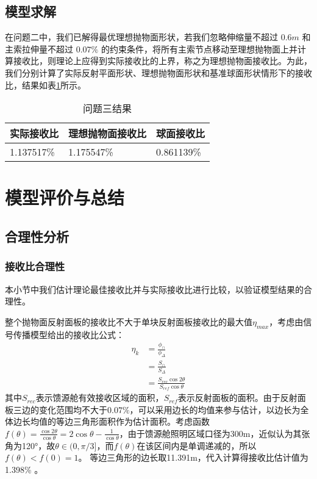 \documentclass[withoutpreface,bwprint,fontset=macnew]{cumcmthesis} %
\begin{document}
	\subsection	{模型求解}
	
		在问题二中，我们已解得最优理想抛物面形状，若我们忽略伸缩量不超过 $0.6m$ 和主索拉伸量不超过 $0.07\%$ 的约束条件，将所有主索节点移动至理想抛物面上并计算接收比，则理论上应得到实际接收比的上界，称之为理想抛物面接收比。为此，我们分别计算了实际反射平面形状、理想抛物面形状和基准球面形状情形下的接收比，结果如表\ref{tab:resultT3}所示。
		
		\begin{table}[!h]
			\centering
			\begin{tabular}{|l|l|l|}
				\hline
				实际接收比 & 理想抛物面接收比 & 球面接收比 \\ \hline
				1.137517\% & 1.175547\% & 0.861139\% \\ \hline
			\end{tabular}
			\caption{问题三结果}
			\label{tab:resultT3}
		\end{table}

	\section{模型评价与总结}
	\subsection{合理性分析}
	\subsubsection {接收比合理性}
		本小节中我们估计理论最佳接收比并与实际接收比进行比较，以验证模型结果的合理性。
		
		
		整个抛物面反射面板的接收比不大于单块反射面板接收比的最大值$\eta_{max}$，考虑由信号传播模型给出的接收比公式：
		\begin{equation*}
		  \begin{aligned}
		    \eta_k &= \frac{\phi_\cap}{\phi_\Delta} \\
		           &= \frac{S_\cap}{S_\Delta} \\
		      	   &= \frac{S_{rec} \cos 2 \theta}{S_{ref} \cos \theta}
		  \end{aligned}
		\end{equation*}
		其中$S_{rec}$表示馈源舱有效接收区域的面积，$S_{ref}$表示反射面板的面积。由于反射面板三边的变化范围均不大于$0.07\%$，可以采用边长的均值来参与估计，以边长为全体边长均值的等边三角形面积作为估计面积。考虑函数$f(\theta) = \frac{\cos 2 \theta}{\cos \theta} = 2\cos \theta - \frac{1}{\cos \theta}$，由于馈源舱照明区域口径为300m，近似认为其张角为120°，故$\theta \in (0, \pi/3]$，而$f(\theta)$在该区间内是单调递减的，所以$f(\theta) < f(0) = 1$。 
		等边三角形的边长取11.391m，代入计算得接收比估计值为1.398\% 。
		
\end{document}
